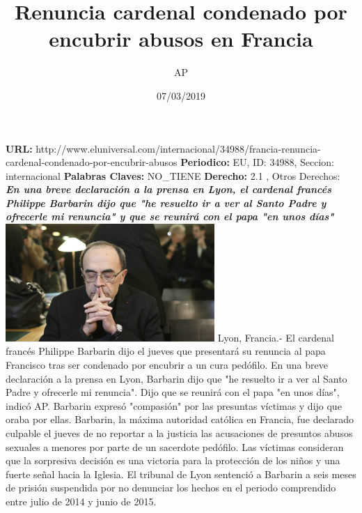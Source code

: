 \documentclass{article}%
\title{\textbf{Renuncia cardenal condenado por encubrir abusos en Francia}}%
\author{AP}%
\date{07/03/2019}%
\begin{document}
%
\normalsize%
\maketitle%
\textbf{URL: }%
http://www.eluniversal.com/internacional/34988/francia{-}renuncia{-}cardenal{-}condenado{-}por{-}encubrir{-}abusos\newline%
%
\textbf{Periodico: }%
EU, %
ID: %
34988, %
Seccion: %
internacional\newline%
%
\textbf{Palabras Claves: }%
NO\_TIENE\newline%
%
\textbf{Derecho: }%
2.1%
, Otros Derechos: %
\newline%
%
\textbf{\textit{En una breve declaración a la prensa en Lyon, el cardenal francés Philippe Barbarin dijo que "he resuelto ir a ver al Santo Padre y ofrecerle mi renuncia" y que se reunirá con el papa "en unos días"}}%
\newline%
\newline%
%
\includegraphics[width=300px]{EU_34988.jpg}%
\newline%
%
Lyon, Francia.{-} El cardenal francés Philippe Barbarin dijo el jueves que presentará su renuncia al papa Francisco tras ser condenado por encubrir a un cura pedófilo.%
\newline%
%
En una breve declaración a la prensa en Lyon, Barbarin dijo que "he resuelto ir a ver al Santo Padre y ofrecerle mi renuncia". Dijo que se reunirá con el papa "en unos días", indicó AP.%
\newline%
%
Barbarin expresó "compasión" por las presuntas víctimas y dijo que oraba por ellas.%
\newline%
%
Barbarin, la máxima autoridad católica en Francia, fue declarado culpable el jueves de no reportar a la justicia las acusaciones de presuntos abusos sexuales a menores por parte de un sacerdote pedófilo. Las víctimas consideran que la sorpresiva decisión es una victoria para la protección de los niños y una fuerte señal hacia la Iglesia.%
\newline%
%
El tribunal de Lyon sentenció a Barbarin a seis meses de prisión suspendida por no denunciar los hechos en el periodo comprendido entre julio de 2014 y junio de 2015.%
\end{document}
